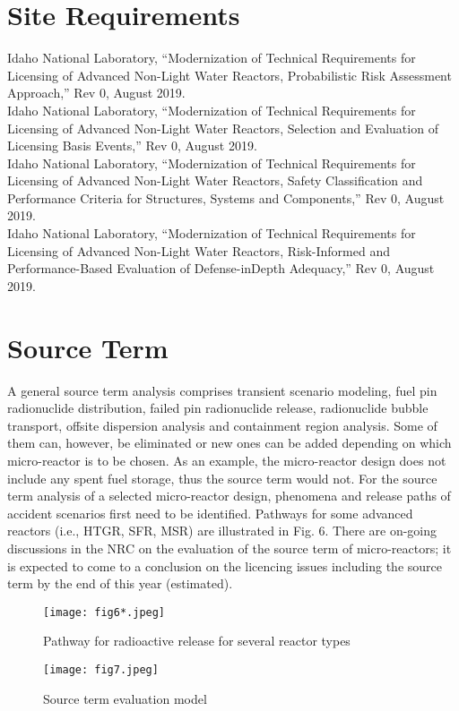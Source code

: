 \documentclass[10pt,a4paper]{article}
\begin{document}
\section{Site Requirements}
Idaho National Laboratory, “Modernization of Technical Requirements for Licensing of Advanced Non-Light Water Reactors, Probabilistic Risk Assessment Approach,” Rev 0, August 2019.\\ 
Idaho National Laboratory, “Modernization of Technical Requirements for Licensing of Advanced Non-Light Water Reactors, Selection and Evaluation of Licensing Basis Events,” Rev 0, August 2019.\\ 
Idaho National Laboratory, “Modernization of Technical Requirements for Licensing of Advanced Non-Light Water Reactors, Safety Classification and Performance Criteria for Structures, Systems and Components,” Rev 0, August 2019.\\ 
Idaho National Laboratory, “Modernization of Technical Requirements for Licensing of Advanced Non-Light Water Reactors, Risk-Informed and Performance-Based Evaluation of Defense-inDepth Adequacy,” Rev 0, August 2019.


\section{Source Term}
A general source term analysis comprises transient scenario modeling, fuel pin radionuclide distribution, failed pin radionuclide release, radionuclide bubble transport, offsite dispersion analysis and containment region analysis. Some of them can, however, be eliminated or new ones can be added depending on which micro-reactor is to be chosen. As an example, the micro-reactor design does not include any spent fuel storage, thus the source term would not.
For the source term analysis of a selected micro-reactor design, phenomena and release paths of accident scenarios first need to be identified. Pathways for some advanced reactors (i.e., HTGR, SFR, MSR) are illustrated in Fig. 6. There are on-going discussions in the NRC on the evaluation of the source term of micro-reactors; it is expected to come to a conclusion on the licencing issues including the source term by the end of this year (estimated). 

\begin{figure}[hbtp]
\centering
\texttt{[image: fig6*.jpeg]}
\caption{Pathway for radioactive release for several reactor types}
\end{figure}

\begin{figure}[hbtp]
\centering
\texttt{[image: fig7.jpeg]}
\caption{Source term evaluation model}
\end{figure}
\end{document}
